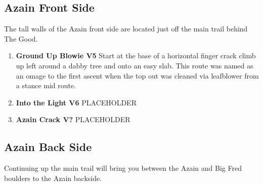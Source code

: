 \subsection*{Azain Front Side}\label{bf:Azain Front Side}
The tall walls of the Azain front side are located just off the main trail behind The Good.

\begin{enumerate}[resume]
	\item\label{rt:Ground Up Blowie} \colorbox{RoyalBlue!20}{\textbf{Ground Up Blowie V5     } }
	\newline Start at the base of a horizontal finger crack climb up left around a dabby tree and onto an easy slab. This route was named as an omage to the first ascent when the top out was cleaned via leafblower from a stance mid route.\
	\item\label{rt:Into the Light} \colorbox{Goldenrod!50}{\textbf{Into the Light V6  } }
	\newline PLACEHOLDER\
	\item\label{rt:Azain Crack} \colorbox{black!20}{\textbf{Azain Crack V?  } }
	\newline PLACEHOLDER\
\end{enumerate}
\subsection*{Azain Back Side}\label{bf:Azain Back Side}
Continuing up the main trail will bring you between the Azain and Big Fred boulders to the Azain backside.

